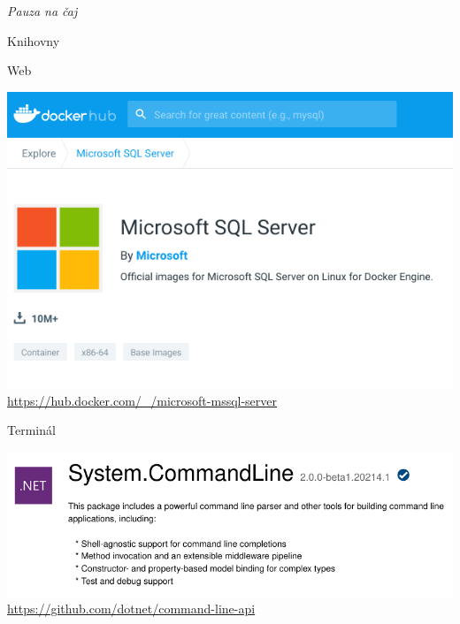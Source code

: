 \documentclass[utf8x]{beamer}
\begin{document}
\begin{frame}
    \begin{center}
        \Huge
        \color{vulkan}
        \rmfamily
        \textit{Pauza na čaj}
    \end{center}
\end{frame}

\begin{frame}
    \begin{center}
        \color{vulkan}
        \Huge \textrm{Knihovny}
    \end{center}
\end{frame}

\begin{frame}
    \begin{center}
        \LARGE \textrm{Web}
    \end{center}
\end{frame}

\begin{frame}
    \centering
    \includegraphics[width=\textwidth]{sqlserver.png}
    \tiny\url{https://hub.docker.com/_/microsoft-mssql-server}
\end{frame}


\begin{frame}
    \begin{center}
        \LARGE \textrm{Terminál}
    \end{center}
\end{frame}

\begin{frame}
    \centering
    \includegraphics[width=\textwidth]{commandline.png}
    \tiny\url{https://github.com/dotnet/command-line-api}
\end{frame}
\end{document}
